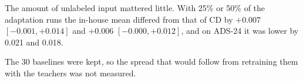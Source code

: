 The amount of unlabeled input mattered little. With 25\% or 50\% of the
adaptation runs the in-house mean differed from that of CD by $+0.007$
$[-0.001, +0.014]$ and $+0.006$ $[-0.000, +0.012]$, and on ADS-24 it
was lower by 0.021 and 0.018.

The 30 baselines were kept, so the spread that would follow from
retraining them with the teachers was not measured.

